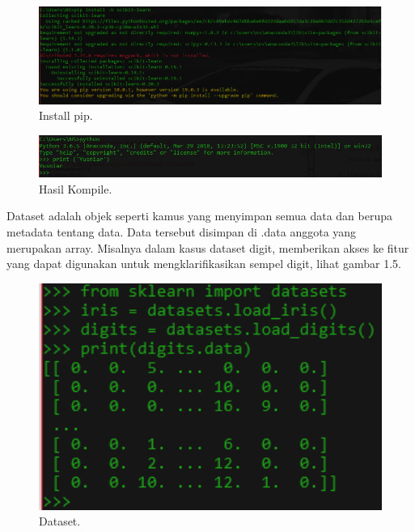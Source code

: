 \begin{enumerate}
\begin{figure}[ht]\centerline{\includegraphics[width=1\textwidth]{figures/33.PNG}}\caption{Install pip.}\end{figure}

\begin{figure}[ht]\centerline{\includegraphics[width=1\textwidth]{figures/35.PNG}}\caption{Hasil Kompile.}\end{figure}




\subitem
Dataset adalah objek seperti kamus yang menyimpan semua data dan berupa metadata tentang data. Data tersebut disimpan di .data anggota yang merupakan array. Misalnya dalam kasus dataset digit, memberikan akses ke fitur yang dapat digunakan untuk mengklarifikasikan sempel digit, lihat gambar 1.5.

\begin{figure}[ht]\centerline{\includegraphics[width=1\textwidth]{figures/36.PNG}}\caption{Dataset.}\end{figure}

\end{enumerate}



